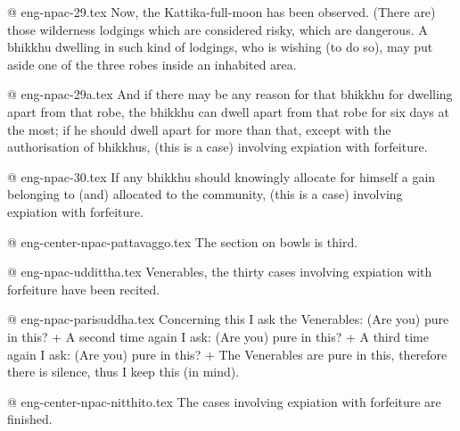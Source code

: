 @ eng-npac-29.tex
Now, the Kattika-full-moon has been observed. (There are) those wilderness lodgings which are considered risky, which are dangerous. A bhikkhu dwelling in such kind of lodgings, who is wishing (to do so), may put aside one of the three robes inside an inhabited area.

@ eng-npac-29a.tex
And if there may be any reason for that bhikkhu for dwelling apart from that robe, the bhikkhu can dwell apart from that robe for six days at the most; if he should dwell apart for more than that, except with the authorisation of bhikkhus, (this is a case) involving expiation with forfeiture.

@ eng-npac-30.tex
If any bhikkhu should knowingly allocate for himself a gain belonging to (and) allocated to the  community, (this is a case) involving expiation with forfeiture.

@ eng-center-npac-pattavaggo.tex
The section on bowls is third.

@ eng-npac-uddittha.tex
Venerables, the thirty cases involving expiation with forfeiture have been recited.

@ eng-npac-parisuddha.tex
Concerning this I ask the Venerables: (Are you) pure in this? +
A second time again I ask: (Are you) pure in this? +
A third time again I ask: (Are you) pure in this? +
The Venerables are pure in this, therefore there is silence, thus I keep this (in mind).

@ eng-center-npac-nitthito.tex
The cases involving expiation with forfeiture are finished.
